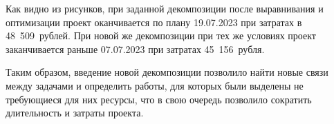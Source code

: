 
\clearpage

Как видно из рисунков, при заданной декомпозиции после выравнивания и оптимизации проект оканчивается по плану 19.07.2023 при затратах в 48~509~рублей. При новой же декомпозиции при тех же условиях проект заканчивается раньше 07.07.2023 при затратах 45~156~рубля.

Таким образом, введение новой декомпозиции позволило найти новые связи между задачами и определить работы, для которых были выделены не требующиеся для них ресурсы, что в свою очередь позволило сократить длительность и затраты проекта.
